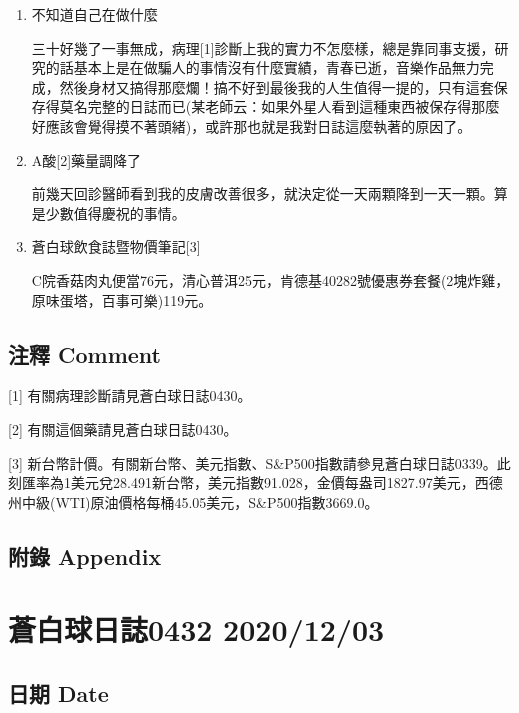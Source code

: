 \documentclass[
]{article}
\begin{document}
\begin{enumerate}
\def\labelenumi{\arabic{enumi}.}
\item
  不知道自己在做什麼

  三十好幾了一事無成，病理{[}1{]}診斷上我的實力不怎麼樣，總是靠同事支援，研究的話基本上是在做騙人的事情沒有什麼實績，青春已逝，音樂作品無力完成，然後身材又搞得那麼爛！搞不好到最後我的人生值得一提的，只有這套保存得莫名完整的日誌而已(某老師云：如果外星人看到這種東西被保存得那麼好應該會覺得摸不著頭緒)，或許那也就是我對日誌這麼執著的原因了。
\item
  A酸{[}2{]}藥量調降了

  前幾天回診醫師看到我的皮膚改善很多，就決定從一天兩顆降到一天一顆。算是少數值得慶祝的事情。
\item
  蒼白球飲食誌暨物價筆記{[}3{]}

  C院香菇肉丸便當76元，清心普洱25元，肯德基40282號優惠券套餐(2塊炸雞，原味蛋塔，百事可樂)119元。
\end{enumerate}

\hypertarget{ux6ce8ux91cb-comment-1}{%
\subsection{注釋 Comment}\label{ux6ce8ux91cb-comment-1}}

{[}1{]} 有關病理診斷請見蒼白球日誌0430。

{[}2{]} 有關這個藥請見蒼白球日誌0430。

{[}3{]}
新台幣計價。有關新台幣、美元指數、S\&P500指數請參見蒼白球日誌0339。此刻匯率為1美元兌28.491新台幣，美元指數91.028，金價每盎司1827.97美元，西德州中級(WTI)原油價格每桶45.05美元，S\&P500指數3669.0。

\hypertarget{ux9644ux9304-appendix-1}{%
\subsection{附錄 Appendix}\label{ux9644ux9304-appendix-1}}

\hypertarget{ux84bcux767dux7403ux65e5ux8a8c0432-20201203}{%
\section{蒼白球日誌0432
2020/12/03}\label{ux84bcux767dux7403ux65e5ux8a8c0432-20201203}}

\hypertarget{ux65e5ux671f-date-2}{%
\subsection{日期 Date}\label{ux65e5ux671f-date-2}}
\end{document}
